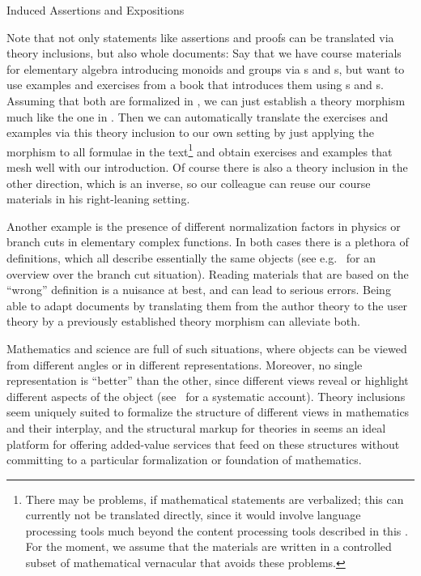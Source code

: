 \begin{omgroup}[id=complex-theories,short=Complex Theories,
                            creators=miko,contributors=frabe]
\begin{omgroup}[id=induced-assertions,short=Induced Assertions]{Induced Assertions and
  Expositions}
\begin{module}[id=assertionvia]
Note that not only statements like assertions and proofs can be translated via theory
inclusions, but also whole documents: Say that we have course materials for elementary
algebra introducing monoids and groups via {s} and
{s}, but want to use examples and exercises from a book that
introduces them using {s} and {s}. Assuming
that both are formalized in \omdoc, we can just establish a theory morphism much like
the one in {}. Then we can automatically translate the
exercises and examples via this theory inclusion to our own setting by just applying the
morphism to all formulae in the text\footnote{There may be problems, if mathematical
  statements are verbalized; this can currently not be translated directly, since it would
  involve language processing tools much beyond the content processing tools described in
  this {\report}. For the moment, we assume that the materials are written in a controlled
  subset of mathematical vernacular that avoids these problems.}  and obtain exercises and
examples that mesh well with our introduction. Of course there is also a theory inclusion
in the other direction, which is an inverse, so our colleague can reuse our course
materials in his right-leaning setting.

Another example is the presence of different normalization factors in physics or branch
cuts in elementary complex functions. In both cases there is a plethora of definitions,
which all describe essentially the same objects (see e.g.~\cite{BraCor:raefca02} for an
overview over the branch cut situation). Reading materials that are based on the ``wrong''
definition is a nuisance at best, and can lead to serious errors. Being able to adapt
documents by translating them from the author theory to the user theory by a previously
established theory morphism can alleviate both.

Mathematics and science are full of such situations, where objects can be viewed from
different angles or in different representations. Moreover, no single representation is
``better'' than the other, since different views reveal or highlight different aspects of
the object (see~\cite{KohKoh:esmk05} for a systematic account). Theory inclusions seem
uniquely suited to formalize the structure of different views in mathematics and their
interplay, and the structural markup for theories in \omdoc seems an ideal platform for
offering added-value services that feed on these structures without committing to a
particular formalization or foundation of mathematics.
\end{module}
\end{omgroup}


\end{omgroup}
